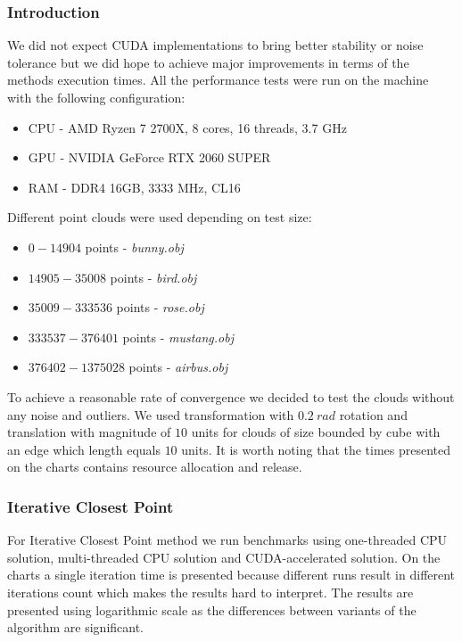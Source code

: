 \documentclass[titlepage]{article}
\begin{document}
\subsubsection{Introduction}
We did not expect CUDA implementations to bring better stability or noise tolerance but we did hope to achieve major improvements in terms of the methods execution times. All the performance tests were run on the machine with the following configuration:
\begin{itemize}
\item CPU - AMD Ryzen 7 2700X, 8 cores, 16 threads, 3.7 GHz
\item GPU - NVIDIA GeForce RTX 2060 SUPER
\item RAM - DDR4 16GB, 3333 MHz, CL16
\end{itemize}

Different point clouds were used depending on test size:
\begin{itemize}
\item $0 - 14904$ points - \textit{bunny.obj}
\item $14905 - 35008$ points - \textit{bird.obj}
\item $35009 - 333536$ points - \textit{rose.obj}
\item $333537 - 376401$ points - \textit{mustang.obj}
\item $376402 - 1375028$ points - \textit{airbus.obj}
\end{itemize}

To achieve a reasonable rate of convergence we decided to test the clouds without any noise and outliers. We used transformation with $0.2\: rad$ rotation and translation with magnitude of $10$ units for clouds of size bounded by cube with an edge which length equals $10$ units. It is worth noting that the times presented on the charts contains resource allocation and release.

\subsubsection{Iterative Closest Point}
For Iterative Closest Point method we run benchmarks using one-threaded CPU solution, multi-threaded CPU solution and CUDA-accelerated solution. On the charts a single iteration time is presented because different runs result in different iterations count which makes the results hard to interpret. The results are presented using logarithmic scale as the differences between variants of the algorithm are significant.
\end{document}
